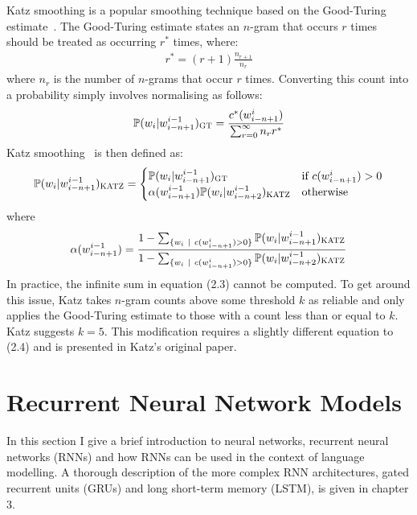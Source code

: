 \documentclass[a4paper, 12pt]{report}
\begin{document}
Katz smoothing is a popular smoothing technique based on the Good-Turing estimate~\cite{good_turing:good1953}. The Good-Turing estimate states an $n$-gram that occurs $r$ times should be treated as occurring $r^*$ times, where:
\begin{gather*}
	r^* = (r + 1)\frac{n_{r + 1}}{n_r}
\end{gather*}
where $n_r$ is the number of $n$-grams that occur $r$ times. Converting this count into a probability simply involves normalising as follows:
\begin{gather}
	\mathbb{P}(w_i | w_{i - n + 1}^{i - 1})_{\text{\scshape GT}} = \frac{c^*(w_{i - n + 1}^{i})}{\sum_{r = 0}^\infty n_r r^*}
\end{gather}
Katz smoothing~\cite{katz_smoothing:katz1987} is then defined as:
\begin{gather}
	\mathbb{P}(w_i | w_{i - n + 1}^{i - 1})_{\text{\scshape KATZ}} = \begin{cases}
		\mathbb{P}(w_i | w_{i - n + 1}^{i - 1})_{\text{\scshape GT}} &\text{if }c(w_{i - n + 1}^i) > 0 \\
		\alpha(w_{i - n + 1}^{i - 1})\mathbb{P}(w_i | w_{i - n + 2}^{i - 1})_{\text{\scshape KATZ}} &\text{otherwise}
	\end{cases}
\end{gather}
where
\begin{gather*}
	\alpha(w_{i - n + 1}^{i - 1}) = \frac{1 - \sum_{\{w_i\ |\ c(w_{i - n + 1}^i) > 0\}} \mathbb{P}(w_i | w_{i - n + 1}^{i - 1})_{\text{\scshape KATZ}}}{1 - \sum_{\{w_i\ |\ c(w_{i - n + 1}^i) > 0\}} \mathbb{P}(w_i | w_{i - n + 2}^{i - 1})_{\text{\scshape KATZ}}}
\end{gather*}
In practice, the infinite sum in equation (2.3) cannot be computed. To get around this issue, Katz takes $n$-gram counts above some threshold $k$ as reliable and only applies the Good-Turing estimate to those with a count less than or equal to $k$. Katz suggests $k = 5$. This modification requires a slightly different equation to (2.4) and is presented in Katz's original paper.

\section{Recurrent Neural Network Models}

In this section I give a brief introduction to neural networks, recurrent neural networks (RNNs) and how RNNs can be used in the context of language modelling. A thorough description of the more complex RNN architectures, gated recurrent units (GRUs) and long short-term memory (LSTM), is given in chapter 3.
\end{document}
